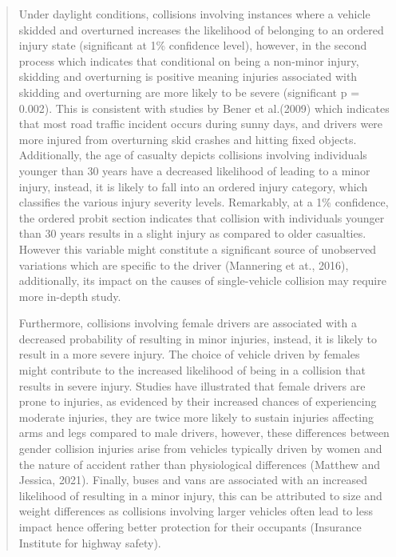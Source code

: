 \documentclass[12]{report}
\begin{document}
\begin{quote}
{Under daylight conditions, collisions involving instances where a vehicle skidded and overturned increases the likelihood of belonging to an ordered injury state (significant at 1\% confidence level), however, in the second process which indicates that conditional on being a non-minor injury, skidding and overturning is positive meaning injuries associated with skidding and overturning are more likely to be severe (significant p = 0.002). This is consistent with studies by Bener et al.(2009) which indicates that most road traffic incident occurs during sunny days, and drivers were more  injured from overturning skid crashes and hitting fixed objects.  Additionally, the age of casualty depicts collisions involving individuals younger than 30 years have a decreased likelihood of leading to a minor injury, instead, it is likely to fall into an ordered injury category, which classifies the various injury severity levels. Remarkably, at a 1\% confidence, the ordered probit section indicates that collision with individuals younger than 30 years results in a slight injury as compared to older casualties. However this variable might constitute a significant source of unobserved variations which are specific to the driver (Mannering et at., 2016), additionally, its impact on the causes of single-vehicle collision may require more in-depth study.  

Furthermore, collisions involving female drivers are associated with a decreased probability of resulting in minor injuries, instead, it is  likely to result in a more severe injury. The choice of vehicle driven by females might contribute to the increased likelihood of being in a collision that results in severe injury. Studies have illustrated that female drivers are prone to injuries, as evidenced by their increased chances of experiencing moderate injuries, they are twice more likely to sustain injuries affecting arms and legs compared to male drivers, however, these differences between gender collision injuries arise from vehicles typically driven by women and the nature of accident rather than physiological differences (Matthew and Jessica, 2021). Finally, buses and vans are associated with an increased likelihood of resulting in a minor injury, this can be attributed to size and weight differences as collisions involving larger vehicles often lead to less impact hence offering better protection for their occupants (Insurance Institute for highway safety).

}
\end{quote}
\end{document}
